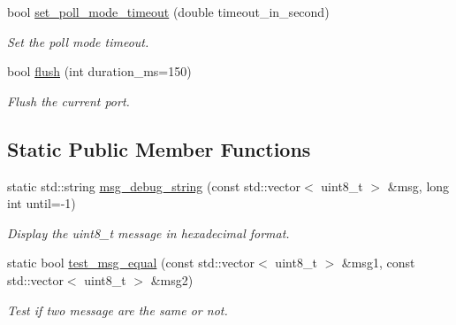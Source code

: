 \begin{DoxyCompactItemize}
bool \hyperlink{classreal__time__tools_1_1UsbStream_a1c61741541acfca7ecf6deaf0b8ad1fc}{set\+\_\+poll\+\_\+mode\+\_\+timeout} (double timeout\+\_\+in\+\_\+second)
\begin{DoxyCompactList}\small\item\em Set the poll mode timeout. \end{DoxyCompactList}\item 
bool \hyperlink{classreal__time__tools_1_1UsbStream_a0bc5fb5783f1833341d55b9b013be6c6}{flush} (int duration\+\_\+ms=150)
\begin{DoxyCompactList}\small\item\em Flush the current port. \end{DoxyCompactList}\end{DoxyCompactItemize}
\subsection*{Static Public Member Functions}
\begin{DoxyCompactItemize}
\item 
static std\+::string \hyperlink{classreal__time__tools_1_1UsbStream_ac98f3cad23dbc85f47405c3809a22198}{msg\+\_\+debug\+\_\+string} (const std\+::vector$<$ uint8\+\_\+t $>$ \&msg, long int until=-\/1)
\begin{DoxyCompactList}\small\item\em Display the uint8\+\_\+t message in hexadecimal format. \end{DoxyCompactList}\item 
static bool \hyperlink{classreal__time__tools_1_1UsbStream_ae3e565f6ea54fb5c4666b98745e9f87f}{test\+\_\+msg\+\_\+equal} (const std\+::vector$<$ uint8\+\_\+t $>$ \&msg1, const std\+::vector$<$ uint8\+\_\+t $>$ \&msg2)
\begin{DoxyCompactList}\small\item\em Test if two message are the same or not. \end{DoxyCompactList}\end{DoxyCompactItemize}
